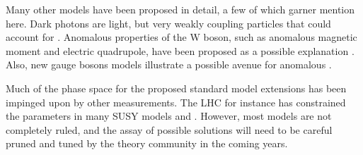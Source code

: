 Many other models have been proposed in detail, a few of which garner mention here.  Dark photons are light, but very weakly coupling particles that could account for \gmtwo {}.  Anomalous properties of the W boson, such as anomalous magnetic moment and electric quadrupole, have been proposed as a possible explanation .  Also, new gauge bosons models illustrate a possible avenue for anomalous \gmtwo.  

Much of the phase space for the proposed standard model extensions has been impinged upon by other measurements.  The LHC for instance has constrained the parameters in many SUSY models and .  However, most models are not completely ruled, and the assay of possible solutions will need to be careful pruned and tuned by the theory community in the coming years.

